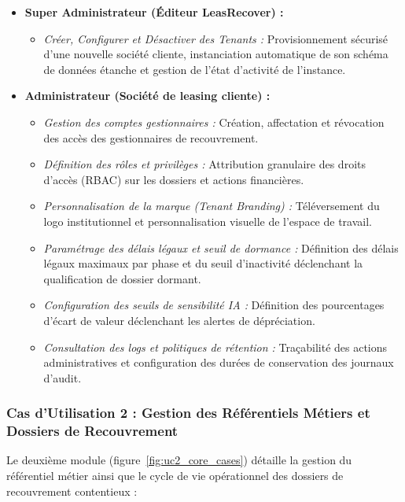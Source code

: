 \begin{itemize}
    \item \textbf{Super Administrateur (Éditeur LeasRecover) :}
    \begin{itemize}
        \item \textit{Créer, Configurer et Désactiver des Tenants :} Provisionnement sécurisé d'une nouvelle société cliente, instanciation automatique de son schéma de données étanche et gestion de l'état d'activité de l'instance.
    \end{itemize}
    \item \textbf{Administrateur (Société de leasing cliente) :}
    \begin{itemize}
        \item \textit{Gestion des comptes gestionnaires :} Création, affectation et révocation des accès des gestionnaires de recouvrement.
        \item \textit{Définition des rôles et privilèges :} Attribution granulaire des droits d'accès (RBAC) sur les dossiers et actions financières.
        \item \textit{Personnalisation de la marque (Tenant Branding) :} Téléversement du logo institutionnel et personnalisation visuelle de l'espace de travail.
        \item \textit{Paramétrage des délais légaux et seuil de dormance :} Définition des délais légaux maximaux par phase et du seuil d'inactivité déclenchant la qualification de dossier dormant.
        \item \textit{Configuration des seuils de sensibilité IA :} Définition des pourcentages d'écart de valeur déclenchant les alertes de dépréciation.
        \item \textit{Consultation des logs et politiques de rétention :} Traçabilité des actions administratives et configuration des durées de conservation des journaux d'audit.
    \end{itemize}
\end{itemize}

\subsubsection{Cas d'Utilisation 2 : Gestion des Référentiels Métiers et Dossiers de Recouvrement}

Le deuxième module (figure~\ref{fig:uc2_core_cases}) détaille la gestion du référentiel métier ainsi que le cycle de vie opérationnel des dossiers de recouvrement contentieux :

